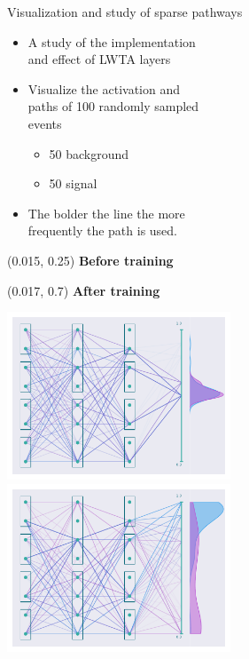\documentclass[UKenglish]{beamer}
\begin{document}
\begin{frame}{Visualization and study of sparse pathways}
    \begin{itemize}
        \item A study of the implementation \\
        and effect of LWTA layers
        \item Visualize the activation and \\
        paths of 100 randomly sampled \\
        events
        \begin{itemize}
            \item 50 background
            \item 50 signal
        \end{itemize}
        \item The bolder the line the more\\ 
        frequently the path is used.
    \end{itemize}
\end{frame}
\begin{frame}
    \begin{textblock}{0.8}(0.015, 0.25)
        \textbf{Before training}
    \end{textblock}
    \begin{textblock}{0.8}(0.017, 0.7)
        \textbf{After training}
    \end{textblock}
    \begin{center}\vspace{-0.5cm}
        \includegraphics[width = 0.5\textwidth]{figures/NetworkVis/BeforeTraining.pdf}
        \includegraphics[width = 0.5\textwidth]{figures/NetworkVis/AfterTraining.pdf}
    \end{center}
\end{frame}
\end{document}
